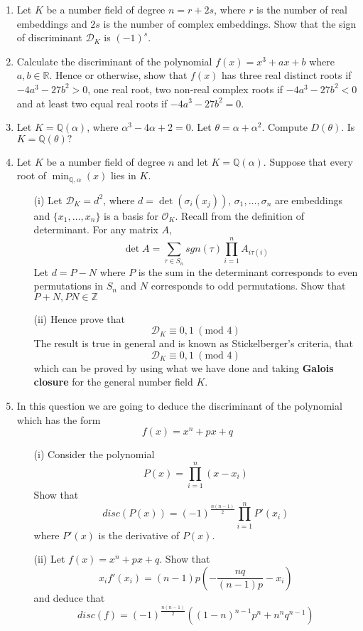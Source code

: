 \begin{enumerate}
\item Let $K$ be a number field of degree $n=r+2s$, where $r$ is the number of real embeddings and $2s$ is the number of complex embeddings. Show that the sign of discriminant $\mathcal{D}_K$ is $(-1)^s$.
\item Calculate the discriminant of the polynomial $f(x)=x^3+ax+b$ where $a,b \in \mathbb{R}$. Hence or otherwise, show that $f(x)$ has three real distinct roots if $-4a^3-27b^2>0$, one real root, two non-real complex roots if $-4a^3-27b^2<0$ and at least two equal real roots if $-4a^3-27b^2=0$.
\item Let $K=\mathbb{Q}(\alpha)$, where $\alpha^3-4\alpha+2=0$. Let $\theta=\alpha+\alpha^2$. Compute $D(\theta)$. Is $K=\mathbb{Q}(\theta)?$
\item Let $K$ be a number field of degree $n$ and let $K=\mathbb{Q}(\alpha)$. Suppose that every root of
$\min_{\mathbb{Q},\alpha}(x)$ lies in $K$.
\begin{enumerate}
\item[(i)] Let $\mathcal{D}_K=d^2$, where $d=\det{(\sigma_i(x_j))}$, $\sigma_1,\ldots,\sigma_n$ are embeddings and $\{x_1,\ldots,x_n\}$ is a basis for $\mathcal{O}_K$. Recall from the definition of determinant. For any matrix $A$,
    $$\det{A}=\sum_{\tau \in S_n} sgn(\tau)\prod_{i=1}^n A_{i \tau(i)}$$
     Let $d=P-N$ where $P$ is the sum in the determinant corresponds to even permutations in $S_n$ and $N$
     corresponds to odd permutations. Show that $P+N,PN \in \mathbb{Z}$
\item[(ii)] Hence prove that
$$\mathcal{D}_K \equiv 0,1~(\text{mod } 4)$$
The result is true in general and is known as Stickelberger's criteria, that
$$\mathcal{D}_K \equiv 0,1~(\text{mod } 4)$$
which can be proved by using what we have done and taking {\bf Galois closure} for the general number field $K$.
\end{enumerate}
\item In this question we are going to deduce the discriminant of the polynomial which has the form
$$f(x)=x^n+px+q$$
\begin{enumerate}
\item[(i)] Consider the polynomial
$$P(x)=\prod_{i=1}^n (x-x_i)$$
Show that
$$disc(P(x))=(-1)^{\frac{n(n-1)}{2}}\prod_{i=1}^nP'(x_i)$$
where $P'(x)$ is the derivative of $P(x)$.
\item[(ii)] Let $f(x)=x^n+px+q$. Show that
$$x_i f'(x_i)=(n-1)p \left(-\frac{nq}{(n-1)p}-x_i \right)$$
and deduce that
$$disc(f)=(-1)^{\frac{n(n-1)}{2}}((1-n)^{n-1}p^n+n^n q^{n-1})$$

\end{enumerate}
\end{enumerate}
